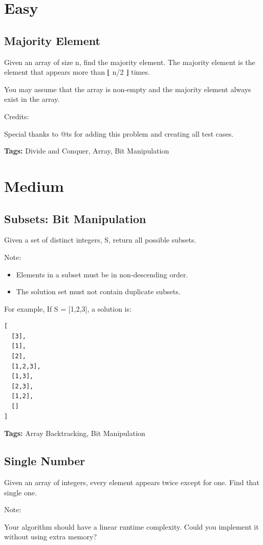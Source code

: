\documentclass[12pt]{book}
\begin{document}
\section{Easy}
\label{sec-17-1}
\subsection{Majority Element}
\label{sec-17-1-1}
Given an array of size n, find the majority element. The majority element is the element that appears more than ⌊ n/2 ⌋ times.

You may assume that the array is non-empty and the majority element always exist in the array.

Credits:

Special thanks to @ts for adding this problem and creating all test cases.

\textbf{Tags:} Divide and Conquer, Array, Bit Manipulation

\section{Medium}
\label{sec-17-2}
\subsection{Subsets: Bit Manipulation}
\label{sec-17-2-1}
Given a set of distinct integers, S, return all possible subsets.

Note:
\begin{itemize}
\item Elements in a subset must be in non-descending order.
\item The solution set must not contain duplicate subsets.
\end{itemize}
For example,
If S = [1,2,3], a solution is:
\lstset{language=java,label= ,caption= ,numbers=none}
\begin{lstlisting}
[
  [3],
  [1],
  [2],
  [1,2,3],
  [1,3],
  [2,3],
  [1,2],
  []
]
\end{lstlisting}
\textbf{Tags:} Array Backtracking, Bit Manipulation
\subsection{Single Number}
\label{sec-17-2-2}
Given an array of integers, every element appears twice except for one. Find that single one.

Note:

Your algorithm should have a linear runtime complexity. Could you implement it without using extra memory?
\end{document}
